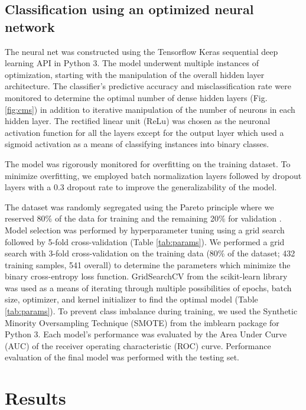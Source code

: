 \documentclass[10pt, letterpaper]{article}
\begin{document}
\begin{multicols*}{2}
\subsection*{Classification using an optimized neural network}
The neural net was constructed using the Tensorflow Keras sequential deep learning API in Python 3. The model underwent multiple instances of optimization, starting with the manipulation of the overall hidden layer architecture. The classifier's predictive accuracy and misclassification rate were monitored to determine the optimal number of dense hidden layers (Fig. \ref{fig:cms}) in addition to iterative manipulation of the number of neurons in each hidden layer. The rectified linear unit (ReLu) was chosen as the neuronal activation function for all the layers except for the output layer which used a sigmoid activation as a means of classifying instances into binary classes.

The model was rigorously monitored for overfitting on the training dataset. To minimize overfitting, we employed batch normalization layers followed by dropout layers with a 0.3 dropout rate to improve the generalizability of the model.

The dataset was randomly segregated using the Pareto principle where we reserved 80\% of the data for training and the remaining 20\% for validation \cite{pareto}. Model selection was performed by hyperparameter tuning using a grid search followed by 5-fold cross-validation (Table \ref{tab:params}). We performed a grid search with 3-fold cross-validation on the training data (80\% of the dataset; 432 training samples, 541 overall) to determine the parameters which minimize the binary cross-entropy loss function. GridSearchCV from the scikit-learn library was used as a means of iterating through multiple possibilities of epochs, batch size, optimizer, and kernel initializer to find the optimal model (Table \ref{tab:params}). To prevent class imbalance during training, we used the Synthetic Minority Oversampling Technique (SMOTE) from the imblearn package for Python 3. Each model’s performance was evaluated by the Area Under Curve (AUC) of the receiver operating characteristic (ROC) curve. Performance evaluation of the final model was performed with the testing set.


\section{Results}


\end{multicols*}
\end{document}
